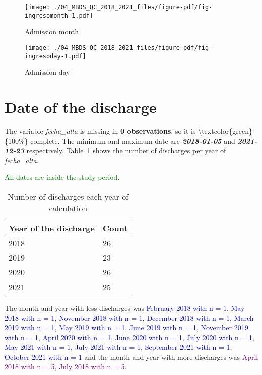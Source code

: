 \documentclass[
  letterpaper,
  DIV=11,
  numbers=noendperiod]{scrreprt}
\begin{document}
\begin{figure}

{\centering \texttt{[image: ./04\_MBDS\_QC\_2018\_2021\_files/figure-pdf/fig-ingresomonth-1.pdf]}

}

\caption{\label{fig-ingresomonth}Admission month}

\end{figure}

\begin{figure}

{\centering \texttt{[image: ./04\_MBDS\_QC\_2018\_2021\_files/figure-pdf/fig-ingresoday-1.pdf]}

}

\caption{\label{fig-ingresoday}Admission day}

\end{figure}

\hypertarget{date-of-the-discharge-1}{%
\section{Date of the discharge}\label{date-of-the-discharge-1}}

The variable \emph{fecha\_alta} is missing in \textbf{0 observations},
so it is \textbackslash textcolor\{green\}\{100\%\} complete. The
minimum and maximum date are \textbf{\emph{2018-01-05}} and
\textbf{\emph{2021-12-23}} respectively. Table~\ref{tbl-fechaalta} shows
the number of discharges per year of \emph{fecha\_alta}.

\textcolor{green}{All dates are inside the study period}.

\hypertarget{tbl-fechaalta}{}
\begin{longtable}{ll}
\caption{\label{tbl-fechaalta}Number of discharges each year of calculation }\tabularnewline

\toprule
Year of the discharge & Count \\ 
\midrule
2018 & 26 \\ 
2019 & 23 \\ 
2020 & 26 \\ 
2021 & 25 \\ 
\bottomrule
\end{longtable}

The month and year with less discharges was
\textcolor{blue}{February 2018 with n = 1},
\textcolor{blue}{May 2018 with n = 1},
\textcolor{blue}{November 2018 with n = 1},
\textcolor{blue}{December 2018 with n = 1},
\textcolor{blue}{March 2019 with n = 1},
\textcolor{blue}{May 2019 with n = 1},
\textcolor{blue}{June 2019 with n = 1},
\textcolor{blue}{November 2019 with n = 1},
\textcolor{blue}{April 2020 with n = 1},
\textcolor{blue}{June 2020 with n = 1},
\textcolor{blue}{July 2020 with n = 1},
\textcolor{blue}{May 2021 with n = 1},
\textcolor{blue}{July 2021 with n = 1},
\textcolor{blue}{September 2021 with n = 1},
\textcolor{blue}{October 2021 with n = 1} and the month and year with
more discharges was \textcolor{purple}{April 2018 with n = 5},
\textcolor{purple}{July 2018 with n = 5}.
\end{document}
